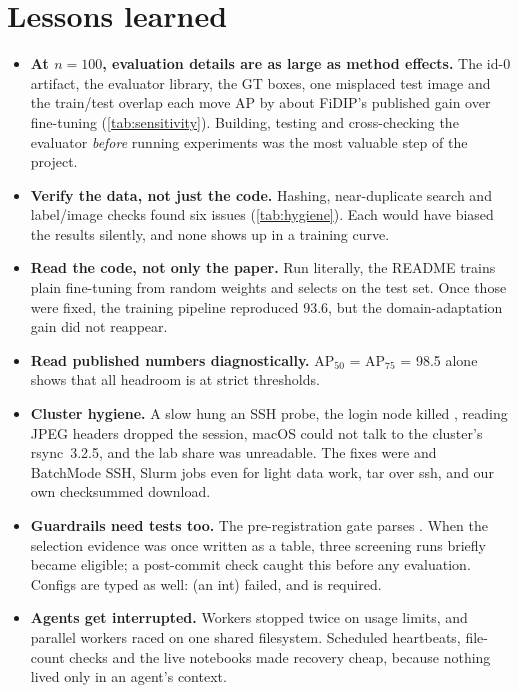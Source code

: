 \section{Lessons learned}\label{sec:lessons}

\begin{itemize}[leftmargin=*]
  \item \textbf{At $n=100$, evaluation details are as large as method effects.} The id-0 artifact, the evaluator library, the GT boxes, one misplaced test image and the train/test overlap each move AP by about FiDIP's published gain over fine-tuning (\cref{tab:sensitivity}). Building, testing and cross-checking the evaluator \emph{before} running experiments was the most valuable step of the project.
  \item \textbf{Verify the data, not just the code.} Hashing, near-duplicate search and label/image checks found six issues (\cref{tab:hygiene}). Each would have biased the results silently, and none shows up in a training curve.
  \item \textbf{Read the code, not only the paper.} Run literally, the README trains plain fine-tuning from random weights and selects on the test set. Once those were fixed, the training pipeline reproduced 93.6, but the domain-adaptation gain did not reappear.
  \item \textbf{Read published numbers diagnostically.} AP$_{50}$ = AP$_{75}$ = 98.5 alone shows that all headroom is at strict thresholds.
  \item \textbf{Cluster hygiene.} A slow  hung an SSH probe, the login node killed , reading JPEG headers dropped the session, macOS  could not talk to the cluster's rsync~3.2.5, and the lab share was unreadable. The fixes were  and BatchMode SSH, Slurm jobs even for light data work, tar over ssh, and our own checksummed download.
  \item \textbf{Guardrails need tests too.} The pre-registration gate parses . When the selection evidence was once written as a table, three screening runs briefly became eligible; a post-commit check caught this before any evaluation. Configs are typed as well:  (an int) failed, and  is required.
  \item \textbf{Agents get interrupted.} Workers stopped twice on usage limits, and parallel workers raced on one shared filesystem. Scheduled heartbeats, file-count checks and the live notebooks made recovery cheap, because nothing lived only in an agent's context.
\end{itemize}

